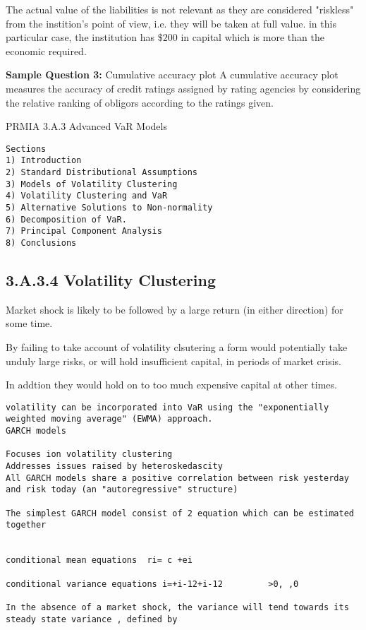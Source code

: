 \documentclass[]{report}
\begin{document}
The actual value of the liabilities is not relevant as they are considered "riskless" from the instition's point of view, i.e. they will be taken at full value. in this particular case, the institution has $\$200$ in capital which is more than the economic required.
 
\textbf{Sample Question 3:} Cumulative accuracy plot
A cumulative accuracy plot measures the accuracy of credit ratings assigned by rating agencies by considering the relative ranking of obligors according to the ratings given.
 
PRMIA 3.A.3 Advanced VaR Models 

\begin{verbatim}
Sections
1) Introduction
2) Standard Distributional Assumptions
3) Models of Volatility Clustering
4) Volatility Clustering and VaR
5) Alternative Solutions to Non-normality
6) Decomposition of VaR.
7) Principal Component Analysis
8) Conclusions
\end{verbatim}
\subsection*{3.A.3.4 Volatility Clustering}

Market shock is likely to be followed by a large return (in either direction) for some time.

By failing to take account of volatility clsutering a form would potentially take unduly large risks, or will hold insufficient capital, in periods of market crisis.

In addtion they would hold on to too much expensive capital at other times.
\begin{verbatim}
volatility can be incorporated into VaR using the "exponentially weighted moving average" (EWMA) approach.
GARCH models

Focuses ion volatility clustering
Addresses issues raised by heteroskedascity
All GARCH models share a positive correlation between risk yesterday and risk today (an "autoregressive" structure)

The simplest GARCH model consist of 2 equation which can be estimated together


conditional mean equations  ri= c +ei

conditional variance equations i=+i-12+i-12			>0, ,0

In the absence of a market shock, the variance will tend towards its steady state variance , defined by
\end{verbatim}
\end{document}
